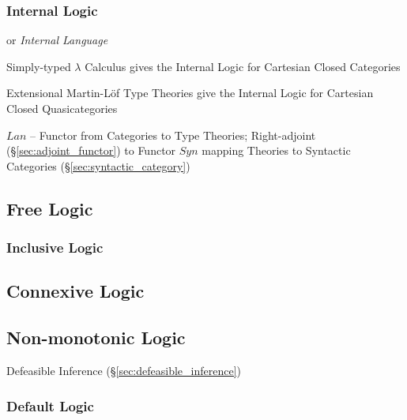 \subsubsection{Internal Logic}\label{sec:internal_logic}

or \emph{Internal Language}

Simply-typed $\lambda$ Calculus gives the Internal Logic for
Cartesian Closed Categories

Extensional Martin-L\"of Type Theories give the Internal Logic for
Cartesian Closed Quasicategories

$Lan$ -- Functor from Categories to Type Theories; Right-adjoint
(\S\ref{sec:adjoint_functor}) to Functor $Syn$ mapping Theories to
Syntactic Categories (\S\ref{sec:syntactic_category})



\subsection{Free Logic}\label{sec:free_logic}

\subsubsection{Inclusive Logic}\label{sec:inclusive_logic}



\subsection{Connexive Logic}\label{sec:connexive_logic}

\subsection{Non-monotonic Logic}\label{sec:nonmonotonic_logic}

Defeasible Inference (\S\ref{sec:defeasible_inference})



\subsubsection{Default Logic}\label{sec:default_logic}

